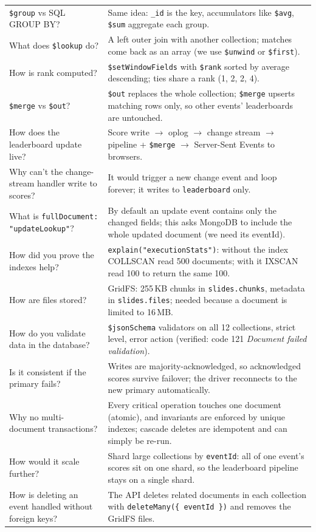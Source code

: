 \documentclass[11pt,a4paper]{article}
\newcommand{\op}[1]{\texttt{\$#1}}
\newcommand{\coll}[1]{\texttt{#1}}
\begin{document}
\begin{longtable}{@{}p{5.6cm}p{9.4cm}@{}}
\op{group} vs SQL GROUP BY? & Same idea: \texttt{\_id} is the key, accumulators like \op{avg}, \op{sum} aggregate each group. \\
What does \op{lookup} do? & A left outer join with another collection; matches come back as an array (we use \op{unwind} or \op{first}). \\
How is rank computed? & \op{setWindowFields} with \op{rank} sorted by average descending; ties share a rank (1, 2, 2, 4). \\
\op{merge} vs \op{out}? & \op{out} replaces the whole collection; \op{merge} upserts matching rows only, so other events' leaderboards are untouched. \\
How does the leaderboard update live? & Score write $\rightarrow$ oplog $\rightarrow$ change stream $\rightarrow$ pipeline + \op{merge} $\rightarrow$ Server-Sent Events to browsers. \\
Why can't the change-stream handler write to scores? & It would trigger a new change event and loop forever; it writes to \coll{leaderboard} only. \\
What is \texttt{fullDocument: "updateLookup"}? & By default an update event contains only the changed fields; this asks MongoDB to include the whole updated document (we need its eventId). \\
How did you prove the indexes help? & \texttt{explain("executionStats")}: without the index COLLSCAN read 500 documents; with it IXSCAN read 100 to return the same 100. \\
How are files stored? & GridFS: 255\,KB chunks in \coll{slides.chunks}, metadata in \coll{slides.files}; needed because a document is limited to 16\,MB. \\
How do you validate data in the database? & \op{jsonSchema} validators on all 12 collections, strict level, error action (verified: code 121 \emph{Document failed validation}). \\
Is it consistent if the primary fails? & Writes are majority-acknowledged, so acknowledged scores survive failover; the driver reconnects to the new primary automatically. \\
Why no multi-document transactions? & Every critical operation touches one document (atomic), and invariants are enforced by unique indexes; cascade deletes are idempotent and can simply be re-run. \\
How would it scale further? & Shard large collections by \texttt{eventId}: all of one event's scores sit on one shard, so the leaderboard pipeline stays on a single shard. \\
How is deleting an event handled without foreign keys? & The API deletes related documents in each collection with \texttt{deleteMany(\{ eventId \})} and removes the GridFS files. \\
\bottomrule
\end{longtable}
\end{document}
